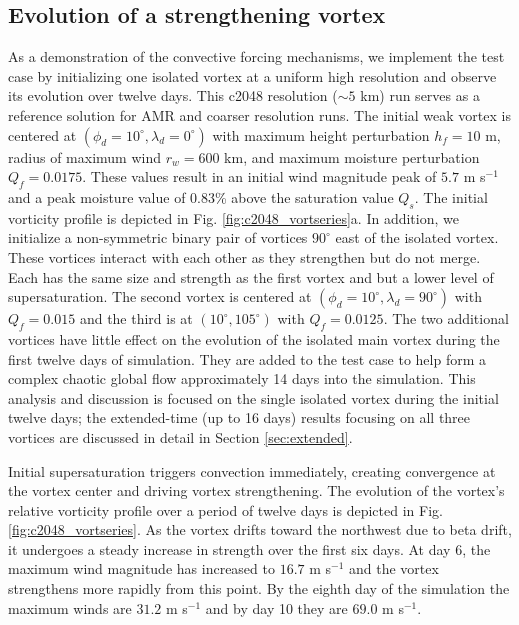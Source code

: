 \documentclass{ametsoc}
\begin{document}
   \subsection{Evolution of a strengthening vortex}
   As a demonstration of the convective forcing mechanisms, we implement the test 
   case by initializing one isolated vortex at a uniform high resolution and observe
   its evolution over twelve days.
   This c2048 resolution ($\sim 5$ km) run serves as a reference solution 
   for AMR and coarser resolution runs. The initial weak vortex is centered at
   $(\phi_d =10^\circ ,  \lambda_d = 0^\circ)$ with maximum height perturbation $h_f=10$ m,
   radius of maximum wind $r_w= 600$ km, and maximum moisture perturbation
   $Q_f=0.0175$. These values result in an initial wind magnitude peak of $ 5.7$ m s$^{-1}$ and 
   a peak moisture value of 0.83\% above the saturation value $Q_s$. The initial vorticity 
   profile is depicted in Fig. \ref{fig:c2048_vortseries}a. In addition, we initialize 
   a non-symmetric binary pair of vortices $90^\circ$ east of the isolated vortex. These vortices 
   interact with each other as they strengthen but do not merge. Each has the same size 
   and strength as the first vortex and but a lower level of supersaturation. 
    The second vortex is centered at
   $(\phi_d =10^\circ , \lambda_d = 90^\circ)$ with $Q_f=0.015$ and the third is
   at $(10^\circ , 105^\circ)$ with $Q_f=0.0125$.
   The two additional vortices have little effect on the 
   evolution of the isolated main vortex during the first twelve days of simulation. They are added
   to the test case to help form a complex chaotic global flow approximately 14 days into the simulation. 
   This analysis and discussion is focused on the single 
   isolated vortex during the initial twelve days; the extended-time (up to 16 days) 
   results focusing on all three vortices are discussed in detail
   in Section \ref{sec:extended}. 
    
   Initial supersaturation triggers convection immediately, 
   creating convergence at the vortex center and driving vortex strengthening.
   The evolution of the vortex's relative vorticity
   profile over a period of twelve days is depicted in Fig. \ref{fig:c2048_vortseries}.
   As the vortex drifts toward the northwest due to beta drift, 
   it undergoes a steady increase in strength over the first six days. 
   At day 6, the maximum wind magnitude has increased to $16.7$ m s$^{-1}$ and the vortex 
   strengthens more rapidly from this point. By the eighth day of the simulation the maximum winds 
   are $31.2$ m s$^{-1}$ and by day 10 they are $69.0$ m s$^{-1}$. 
   
\end{document}
